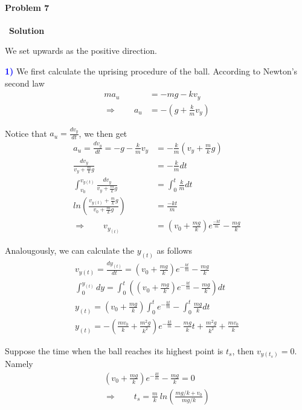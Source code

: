 \documentclass[12pt,a4paper]{article}
\begin{document}
\paragraph{\large \textbf{Problem 7}}~{\textbf{Solution}}
\vspace{2mm}
\par We set upwards as the positive direction.
\par \textbf{\textcolor{blue}{1)}} We first calculate the uprising procedure of the ball. According to Newton's second law
\begin{align*}
	ma_u &= - mg - kv_y\\
\Rightarrow \quad \quad a_u &= -(g + \frac{k}{m}v_y)
\end{align*}
\par Notice that $a_u = \frac{dv_y}{dt}$, we then get
\begin{align*}
	a_u = \frac{dv_y}{dt} = -g - \frac{k}{m}v_y &= -\frac{k}{m}\left( v_y + \frac{m}{k}g \right)\\
	\frac{dv_y}{v_y + \frac{m}{k}g} &= -\frac{k}{m}dt\\
	\int_{v_0}^{v_{y(t)}} \frac{dv_y}{v_y + \frac{m}{k}g} &= \int_0^{t} \frac{k}{m}dt\\
	ln \left( \frac{v_{y(t)} + \frac{m}{k}g}{v_0 + \frac{m}{k}g} \right) &= \frac{-kt}{m}\\
\Rightarrow\quad \quad v_{y_{(t)}} &= \left( v_0 + \frac{mg}{k} \right) e^{\frac{-kt}{m}} - \frac{mg}{k}
\end{align*}
\par Analougously, we can calculate the $y_{(t)}$ as follows
\begin{align*}
	v_{y(t)} = \frac{dy_{(t)}}{dt} = \left( v_0 + \frac{mg}{k} \right) e^{-\frac{kt}{m}} - \frac{mg}{k}\\
	\int_0^{y_{(t)}} dy = \int_0^t \left( \left( v_0 + \frac{mg}{k} \right) e^{-\frac{kt}{m}} - \frac{mg}{k} \right) dt\\
	y_{(t)} = \left( v_0 + \frac{mg}{k} \right) \int_0^t e^{-\frac{kt}{m}} - \int_0^t \frac{mg}{k} dt\\
	y_{(t)} = -\left( \frac{mv_0}{k} + \frac{m^2g}{k^2} \right) e^{-\frac{kt}{m}} - \frac{mg}{k}t + \frac{m^2g}{k^2} + \frac{mv_0}{k}
\end{align*}
\vspace{4mm}
\par Suppose the time when the ball reaches its highest point is $t_s$, then $v_{y(t_s)} = 0$. Namely
\begin{align*}
	\left( v_0 + \frac{mg}{k} \right) e^{-\frac{kt}{m}} - \frac{mg}{k} = 0\\
\Rightarrow\quad \quad t_s = \frac{m}{k}\ ln \left( \frac{mg/k + v_0}{mg/k} \right)
\end{align*}
\end{document}
